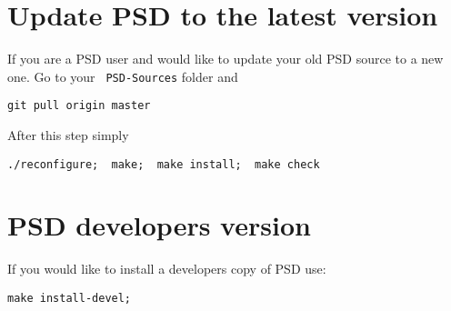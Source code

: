 \section{Update PSD to the latest version}

If you are a PSD user and would like to update your old PSD source to a new one. Go to your \lstinline[style=Linux]! PSD-Sources! folder and

\begin{lstlisting}[style=Linux]
git pull origin master
\end{lstlisting}

After this step simply

\begin{lstlisting}[style=Linux]
./reconfigure;  make;  make install;  make check
\end{lstlisting}

\section{PSD developers version}

If you would like to install  a developers copy  of PSD use:

\begin{lstlisting}[style=Linux]
make install-devel;
\end{lstlisting}
